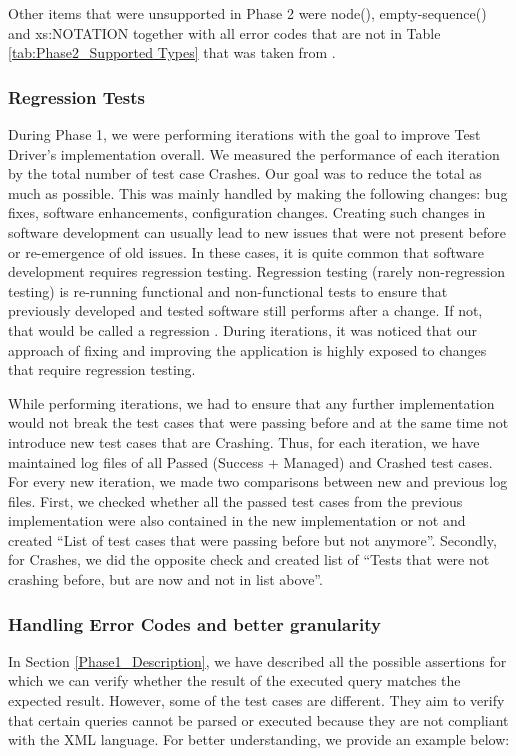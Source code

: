 Other items that were unsupported in Phase 2 were node(), empty-sequence() and xs:NOTATION together with all error codes that are not in Table \ref{tab:Phase2_Supported Types} that was taken from \cite{RumbleSupportedErrorCodes}.

\subsubsection{Regression Tests}
During Phase 1, we were performing iterations with the goal to improve Test Driver's implementation overall. We measured the performance of each iteration by the total number of test case Crashes. Our goal was to reduce the total as much as possible. This was mainly handled by making the following changes: bug fixes, software enhancements, configuration changes. Creating such changes in software development can usually lead to new issues that were not present before or re-emergence of old issues. In these cases, it is quite common that software development requires regression testing. Regression testing (rarely non-regression testing) is re-running functional and non-functional tests to ensure that previously developed and tested software still performs after a change. If not, that would be called a regression \cite{RegressionTesting}. During iterations, it was noticed that our approach of fixing and improving the application is highly exposed to changes that require regression testing. 

While performing iterations, we had to ensure that any further implementation would not break the test cases that were passing before and at the same time not introduce new test cases that are Crashing. Thus, for each iteration, we have maintained log files of all Passed (Success + Managed) and Crashed test cases. For every new iteration, we made two comparisons between new and previous log files. First, we checked whether all the passed test cases from the previous implementation were also contained in the new implementation or not and created ``List of test cases that were passing before but not anymore''. Secondly, for Crashes, we did the opposite check and created list of ``Tests that were not crashing before, but are now and not in list above''. 

\subsubsection{Handling Error Codes and better granularity}
\label{Phase2_ErrorCodes}
In Section \ref{Phase1_Description}, we have described all the possible assertions for which we can verify whether the result of the executed query matches the expected result. However, some of the test cases are different. They aim to verify that certain queries cannot be parsed or executed because they are not compliant with the XML language. For better understanding, we provide an example below:

